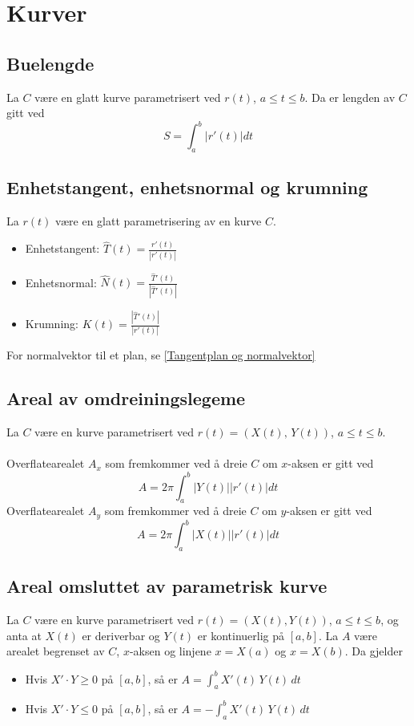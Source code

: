 \documentclass{article}
\begin{document}
\section{Kurver}


\subsection{Buelengde}
La  $C$ være en glatt kurve parametrisert ved $r(t)$, $a\leq t \leq b$. Da er lengden av $C$  gitt ved
\[S = \int_a^b \left| r'(t) \right| dt\]


\subsection{Enhetstangent, enhetsnormal og krumning}
La $r(t)$ være en glatt parametrisering av en kurve $C$.
\begin{itemize}
    \item Enhetstangent: $\hat{T}(t) = \frac{r'(t)}{\left| r'(t) \right|}$
    \item Enhetsnormal: $\hat{N}(t) = \frac{\hat{T}'(t)}{\left| \hat{T}'(t) \right|}$
    \item Krumning: $K(t) = \frac{\left| \hat{T}'(t) \right|}{\left| r'(t) \right|}$
\end{itemize}
For normalvektor til et plan, se \ref{Tangentplan og normalvektor}

\subsection{Areal av omdreiningslegeme}
La $C$ være en kurve parametrisert ved $r(t) = (X(t),\,Y(t))$, $a \leq t \leq b$. \\\\
Overflatearealet $A_x$ som fremkommer ved å dreie $C$ om $x$-aksen er gitt ved
\[A = 2\pi \int_a^b \left| Y(t) \right| \left| r'(t) \right| dt \]
Overflatearealet $A_y$ som fremkommer ved å dreie $C$ om $y$-aksen er gitt ved
\[A = 2\pi \int_a^b \left| X(t) \right| \left| r'(t) \right| dt \]


\subsection{Areal omsluttet av parametrisk kurve}
La $C$ være en kurve parametrisert ved $r(t) = (X(t), Y(t))$, $a \leq t \leq b$, og anta at $X(t)$ er deriverbar og $Y(t)$ er kontinuerlig på $\left[ a, b \right]$. La $A$ være arealet begrenset av $C$, $x$-aksen og linjene $x=X(a)$ og $x=X(b)$. Da gjelder
\begin{itemize}
    \item Hvis $X' \cdot Y \geq 0$ på $\left[ a, b \right]$, så er $A = \int_a^b X'(t)\,Y(t)\,dt$
    \item Hvis $X' \cdot Y \leq 0$ på $\left[ a, b \right]$, så er $A = -\int_a^b X'(t)\,Y(t)\,dt$
\end{itemize}
\end{document}
